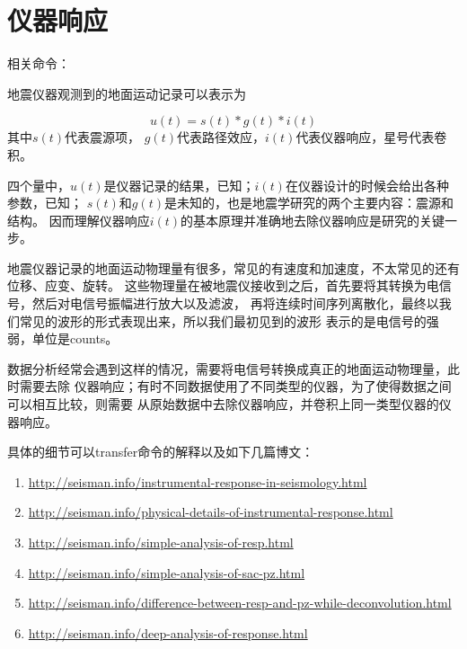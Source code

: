 \section{仪器响应}
相关命令：

地震仪器观测到的地面运动记录可以表示为

\[  u(t) = s(t) * g(t) * i(t) \] 
其中$s(t)$代表震源项， $g(t)$代表路径效应，$i(t)$代表仪器响应，星号代表卷积。

四个量中，$u(t)$是仪器记录的结果，已知；$i(t)$在仪器设计的时候会给出各种参数，已知；
$s(t)$和$g(t)$是未知的，也是地震学研究的两个主要内容：震源和结构。
因而理解仪器响应$i(t)$的基本原理并准确地去除仪器响应是研究的关键一步。

地震仪器记录的地面运动物理量有很多，常见的有速度和加速度，不太常见的还有位移、应变、旋转。
这些物理量在被地震仪接收到之后，首先要将其转换为电信号，然后对电信号振幅进行放大以及滤波，
再将连续时间序列离散化，最终以我们常见的波形的形式表现出来，所以我们最初见到的波形
表示的是电信号的强弱，单位是counts。

数据分析经常会遇到这样的情况，需要将电信号转换成真正的地面运动物理量，此时需要去除
仪器响应；有时不同数据使用了不同类型的仪器，为了使得数据之间可以相互比较，则需要
从原始数据中去除仪器响应，并卷积上同一类型仪器的仪器响应。

具体的细节可以transfer命令的解释以及如下几篇博文：
\begin{enumerate}
\item \url{http://seisman.info/instrumental-response-in-seismology.html}
\item \url{http://seisman.info/physical-details-of-instrumental-response.html}
\item \url{http://seisman.info/simple-analysis-of-resp.html}
\item \url{http://seisman.info/simple-analysis-of-sac-pz.html}
\item \url{http://seisman.info/difference-between-resp-and-pz-while-deconvolution.html}
\item \url{http://seisman.info/deep-analysis-of-response.html}
\end{enumerate}
